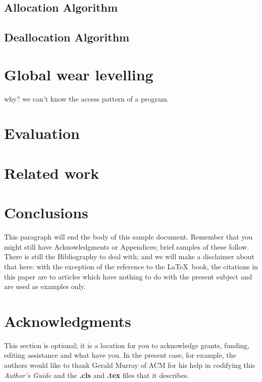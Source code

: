 \documentclass{vldb}
\begin{document}
\subsection{Allocation Algorithm}

\subsection{Deallocation Algorithm}

\section{Global wear levelling}

why? we can’t know the access pattern of a program.

\section{Evaluation}

\section{Related work}



\section{Conclusions}
This paragraph will end the body of this sample document.
Remember that you might still have Acknowledgments or
Appendices; brief samples of these
follow.  There is still the Bibliography to deal with; and
we will make a disclaimer about that here: with the exception
of the reference to the \LaTeX\ book, the citations in
this paper are to articles which have nothing to
do with the present subject and are used as
examples only.

\balance

\section{Acknowledgments}
This section is optional; it is a location for you
to acknowledge grants, funding, editing assistance and
what have you.  In the present case, for example, the
authors would like to thank Gerald Murray of ACM for
his help in codifying this \textit{Author's Guide}
and the \textbf{.cls} and \textbf{.tex} files that it describes.
\end{document}
